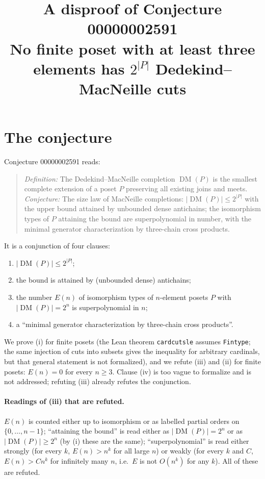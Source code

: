 \documentclass[11pt]{article}
\title{A disproof of Conjecture 00000002591\\[2pt]
\large No finite poset with at least three elements has $2^{|P|}$ Dedekind--MacNeille cuts}
\date{}
\theoremstyle{definition}
\theoremstyle{remark}
\renewcommand{\_}{\oldus\allowbreak}
\newcommand{\DM}{\operatorname{DM}}
\begin{document}
\sloppy
\maketitle

\section{The conjecture}

Conjecture 00000002591 reads:

\begin{quote}
\emph{Definition:} The Dedekind--MacNeille completion $\DM(P)$ is the smallest complete extension of a
poset $P$ preserving all existing joins and meets. \emph{Conjecture:} The size law of MacNeille
completions: $|\DM(P)| \le 2^{|P|}$ with the upper bound attained by unbounded dense antichains; the
isomorphism types of $P$ attaining the bound are superpolynomial in number, with the minimal generator
characterization by three-chain cross products.
\end{quote}

It is a conjunction of four clauses:
\begin{enumerate}[label=(\roman*)]
\item $|\DM(P)| \le 2^{|P|}$;
\item the bound is attained by (unbounded dense) antichains;
\item the number $E(n)$ of isomorphism types of $n$-element posets $P$ with $|\DM(P)| = 2^n$ is
  superpolynomial in $n$;
\item a ``minimal generator characterization by three-chain cross products''.
\end{enumerate}
We prove (i) for finite posets (the Lean theorem \texttt{card\_cuts\_le} assumes \texttt{Fintype}; the
same injection of cuts into subsets gives the inequality for arbitrary cardinals, but that general
statement is not formalized), and we refute (iii) and (ii) for finite posets: $E(n) = 0$ for every
$n \ge 3$.
Clause (iv) is too vague to formalize and is not addressed; refuting (iii) already refutes the
conjunction.

\paragraph{Readings of (iii) that are refuted.} $E(n)$ is counted either up to isomorphism or as labelled
partial orders on $\{0,\dots,n-1\}$; ``attaining the bound'' is read either as $|\DM(P)| = 2^n$ or as
$|\DM(P)| \ge 2^n$ (by (i) these are the same); ``superpolynomial'' is read either strongly (for every
$k$, $E(n) > n^k$ for all large $n$) or weakly (for every $k$ and $C$, $E(n) > C n^k$ for infinitely many
$n$, i.e.\ $E$ is not $O(n^k)$ for any $k$). All of these are refuted.
\end{document}
